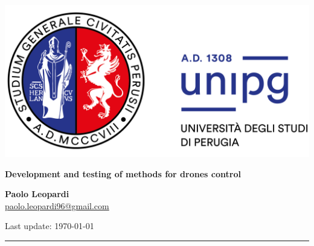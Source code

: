 \begin{titlepage}
	
	
	\begin{center}
		
		\includegraphics[scale=.1]{unipg-logo-title-2364x1862.png} 
		
		   	
		
		\vspace{1cm}
		
		
		\vspace{.5cm}
		\textbf{\LARGE{Development and testing of methods for drones control}}
		
		\vspace{1cm}
		
		
		
		\textbf{Paolo Leopardi}\\ \href{mailto:paolo.leopardi96@gmail.com}{paolo.leopardi96@gmail.com}
		\vspace{1cm}
		
		\begin{flushright}
			{\small Last update: \today}
		\end{flushright}
		\vspace{-.5cm}
		\rule{\textwidth}{.1cm}
		
	\end{center}
	
	\tableofcontents
	
	
\end{titlepage}